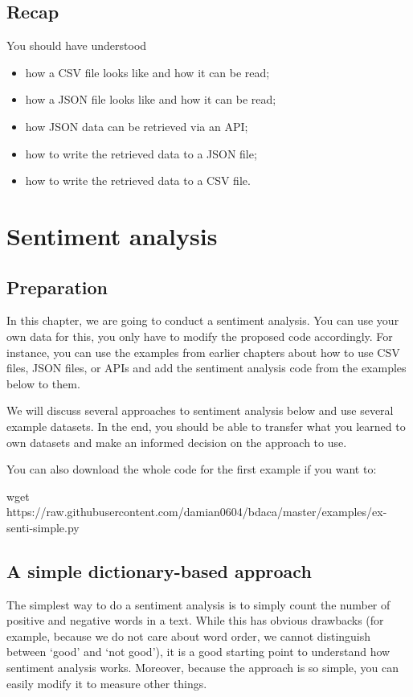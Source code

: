 \documentclass[a4paper,12pt]{book}
\begin{document}
\section{Recap}
You should have understood 
\begin{itemize}
\item how a CSV file looks like and how it can be read;
\item how a JSON file looks like and how it can be read;
\item how JSON data can be retrieved via an API;
\item how to write the retrieved data to a JSON file;
\item how to write the retrieved data to a CSV file.
\end{itemize}


\chapter{Sentiment analysis}
\section{Preparation}
In this chapter, we are going to conduct a sentiment analysis. You can use your own data for this, you only have to modify the proposed code accordingly. For instance, you can use the examples from earlier chapters about how to use CSV files, JSON files, or APIs and add the sentiment analysis code from the examples below to them.

We will discuss several approaches to sentiment analysis below and use several example datasets. In the end, you should be able to transfer what you learned to own datasets and make an informed decision on the approach to use.


You can also download the whole code for the first example if you want to:

\begin{lstlistingbash}
wget https://raw.githubusercontent.com/damian0604/bdaca/master/examples/ex-senti-simple.py
\end{lstlistingbash}


\section{A simple dictionary-based approach}
\label{simplesent}

The simplest way to do a sentiment analysis is to simply count the number of positive and negative words in a text. While this has obvious drawbacks (for example, because we do not care about word order, we cannot distinguish between `good' and `not good'), it is a good starting point to understand how sentiment analysis works. Moreover, because the approach is so simple, you can easily modify it to measure other things.
\end{document}
